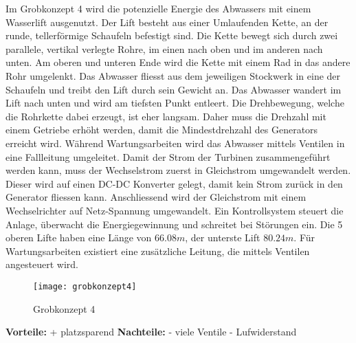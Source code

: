 Im Grobkonzept 4 wird die potenzielle Energie des Abwassers mit einem Wasserlift ausgenutzt. Der Lift besteht aus einer Umlaufenden Kette, an der runde, tellerförmige Schaufeln befestigt sind. Die Kette bewegt sich  durch zwei parallele, vertikal verlegte Rohre, im einen nach oben und im anderen nach unten. Am oberen und unteren Ende wird die Kette mit einem Rad in das andere Rohr umgelenkt. Das Abwasser fliesst aus dem jeweiligen Stockwerk in eine der Schaufeln und treibt den Lift durch sein Gewicht an. Das Abwasser wandert im Lift nach unten und wird am tiefsten Punkt entleert. Die Drehbewegung, welche die Rohrkette dabei erzeugt, ist eher langsam. Daher muss die Drehzahl mit einem Getriebe erhöht werden, damit die Mindestdrehzahl des Generators erreicht wird. Während Wartungsarbeiten wird das Abwasser mittels Ventilen in eine Fallleitung umgeleitet. Damit der Strom der Turbinen zusammengeführt werden kann, muss der Wechselstrom zuerst in Gleichstrom umgewandelt werden. Dieser wird auf einen DC-DC Konverter gelegt, damit kein Strom zurück in den Generator fliessen kann. Anschliessend wird der Gleichstrom mit einem Wechselrichter auf Netz-Spannung umgewandelt. Ein Kontrollsystem steuert die Anlage, überwacht die Energiegewinnung und schreitet bei Störungen ein. Die 5 oberen Lifte haben eine Länge von \(66.08m\), der unterste Lift \(80.24m\). Für Wartungsarbeiten existiert eine zusätzliche Leitung, die mittels Ventilen angesteuert wird.
\newpage
\begin{wrapfigure}{r}{0.5\textwidth}
  \begin{center}
    \texttt{[image: grobkonzept4]}
  \end{center}
  \caption{Grobkonzept 4}
\end{wrapfigure}


\textbf{Vorteile:}							\newline
+ 	platzsparend								\newline
\newline
\textbf{Nachteile:}\newline
-	viele Ventile								\newline
-	Lufwiderstand							\newline
\WFclear			
\newpage